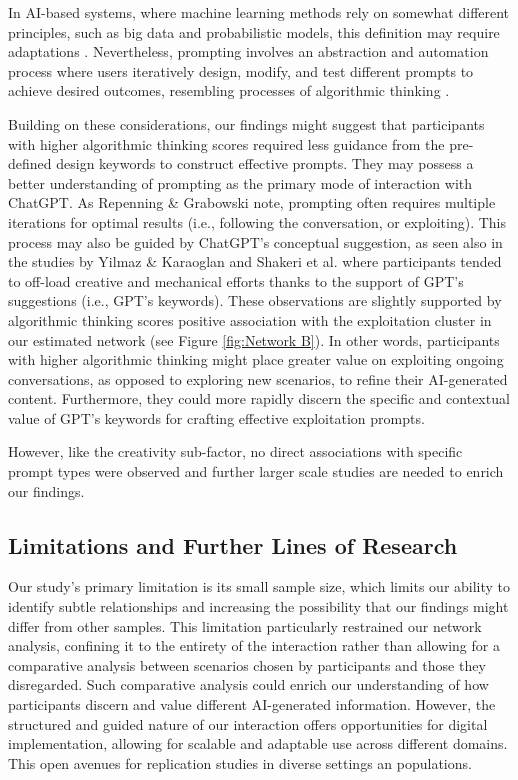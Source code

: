 \documentclass[sn-mathphys, Numbered]{sn-jnl}%
\theoremstyle{thmstyleone}%
\theoremstyle{thmstyletwo}%
\theoremstyle{thmstylethree}%
\begin{document}
In AI-based systems,  where machine learning methods rely on somewhat different principles, such as big data and probabilistic models, this definition may require adaptations \parencite{marcus_modeling_2019, tedre_ct_2021}. Nevertheless, prompting involves an abstraction and automation process where users iteratively design, modify, and test different prompts to achieve desired outcomes, resembling processes of algorithmic thinking \parencite{repenning_proomting_2023}. 

Building on these considerations, our findings might suggest that participants with higher algorithmic thinking scores required less guidance from the pre-defined design keywords to construct effective prompts. 
They may possess a better understanding of prompting as the primary mode of interaction with ChatGPT. 
As Repenning \& Grabowski \parencite*{repenning_proomting_2023} note, prompting often requires multiple iterations for optimal results (i.e., following the conversation, or exploiting). This process may also be guided by ChatGPT's conceptual suggestion, as seen also in the studies by Yilmaz \& Karaoglan \parencite*{yilmaz_effect_2023} and Shakeri et al. \parencite*{shakeri_saga_2021} where participants tended to off-load creative and mechanical efforts thanks to the support of GPT's suggestions (i.e., GPT's keywords). These observations are slightly supported by algorithmic thinking scores positive association with the exploitation cluster in our estimated network (see Figure \ref{fig:Network B}). In other words, participants with higher algorithmic thinking might place greater value on exploiting ongoing conversations, as opposed to exploring new scenarios, to refine their AI-generated content. Furthermore, they could more rapidly discern the specific and contextual value of GPT's keywords for crafting effective exploitation prompts.

However, like the creativity sub-factor, no direct associations with specific prompt types were observed and further larger scale studies are needed to enrich our findings.


\subsection*{Limitations and Further Lines of Research}\label{Limitations}

Our study's primary limitation is its small sample size, which limits our ability to identify subtle relationships and increasing the possibility that our findings might differ from other samples. This limitation particularly restrained our network analysis, confining it to the entirety of the interaction rather than allowing for a comparative analysis between scenarios chosen by participants and those they disregarded. Such comparative analysis could enrich our understanding of how participants discern and value different AI-generated information. However, the structured and guided nature of our interaction offers opportunities for digital implementation, allowing for scalable and adaptable use across different domains. This open avenues for replication studies in diverse settings an populations. 
\end{document}
